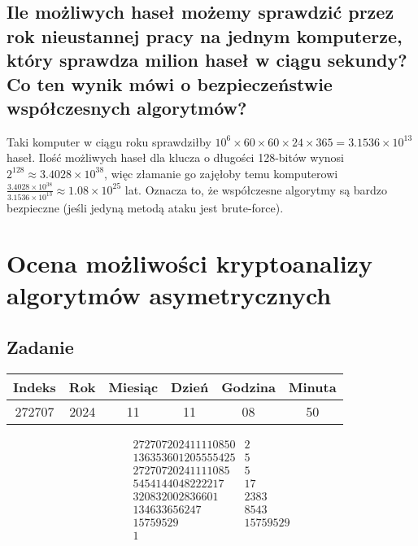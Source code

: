 \documentclass{article}
\begin{document}
\subsection{Ile możliwych haseł możemy sprawdzić przez rok nieustannej pracy na jednym komputerze, który sprawdza milion haseł w ciągu sekundy? Co ten wynik mówi o bezpieczeństwie współczesnych algorytmów?}
Taki komputer w ciągu roku sprawdziłby \(10^{6} \times 60 \times 60 \times 24 \times 365 =  3.1536 \times 10^{13} \) haseł. Ilość możliwych haseł dla klucza o długości 128-bitów wynosi \(2^{128} \approx 3.4028 \times 10^{38}\), więc złamanie go zajęłoby temu komputerowi
\( \frac{3.4028 \times 10^{38}}{3.1536 \times 10^{13}} \approx 1.08 \times 10^{25} \) lat. Oznacza to, że współczesne algorytmy są bardzo bezpieczne (jeśli jedyną metodą ataku jest brute-force).



\section{Ocena możliwości kryptoanalizy algorytmów asymetrycznych}
\subsection{Zadanie}
\begin{table}[H]
    \centering
    \begin{tabular}{|c|c|c|c|c|c|}
        \hline
        \textbf{Indeks} & \textbf{Rok} & \textbf{Miesiąc} & \textbf{Dzień} & \textbf{Godzina} & \textbf{Minuta} \\ \hline
        272707          & 2024         & 11               & 11             & 08               & 50              \\ \hline
    \end{tabular}
\end{table}

\[
    \begin{array}{r|l}
        272707202411110850 & 2        \\
        136353601205555425 & 5        \\
        27270720241111085  & 5        \\
        5454144048222217   & 17       \\
        320832002836601    & 2383     \\
        134633656247       & 8543     \\
        15759529           & 15759529 \\
        1
    \end{array}
\]
\end{document}
